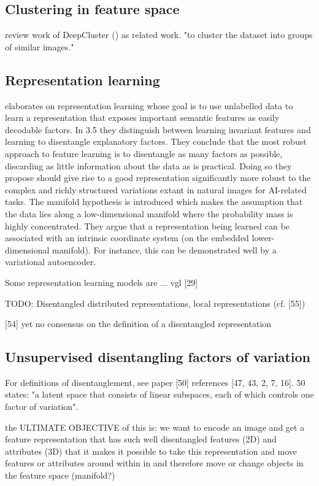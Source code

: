 \documentclass[12pt,a4paper]{article}
\begin{document}
\subsection{Clustering in feature space}
review work of DeepCluster (\cite{1807.05520}) as related work.
"to cluster the dataset into groups of similar images."

\subsection{Representation learning}
\par\cite{1206.5538} elaborates on representation learning whose goal is to use unlabelled data to learn a representation that exposes important semantic features as easily decodable factors. In 3.5 they distinguish between learning invariant features and learning to disentangle explanatory factors. They conclude that the most robust approach to feature learning is to disentangle as many factors as possible, discarding as little information about the data as is practical. Doing so they propose should give rise to a good representation significantly more robust to the complex and richly structured variations extant in natural images for AI-related tasks. The manifold hypothesis is introduced which makes the assumption that the data lies along a low-dimensional manifold where the probability mass is highly concentrated. They argue that a representation being learned can be associated with an intrinsic coordinate system (on the embedded lower-dimensional manifold). For instance, this can be demonstrated well by a variational autoencoder.

Some representation learning models are ... vgl [29]

TODO: Disentangled distributed representations, local representations  (cf. [55])

[54] yet no consensus on the definition of a disentangled representation

\subsection{Unsupervised disentangling factors of variation}
For definitions of disentanglement, see paper [50] references [47, 43, 2, 7, 16]. 50 states: "a latent space that consists of linear subspaces, each of which controls one factor of variation".

\par the ULTIMATE OBJECTIVE of this is: we want to encode an image and get a feature representation that has such well disentangled features (2D) and attributes (3D) that it makes it possible to take this representation and move features or attributes around within in and therefore move or change objects in the feature space (manifold?)
\end{document}
